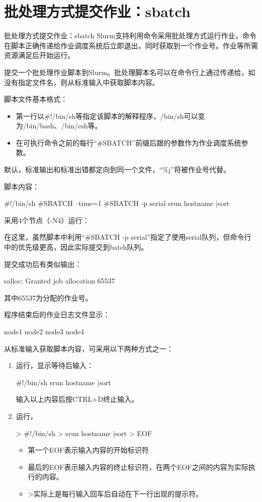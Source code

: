 \section{批处理方式提交作业：sbatch}
\begin{frame}[fragile]{批处理方式提交作业：sbatch}
Slurm支持利用命令采用批处理方式运行作业，命令在脚本正确传递给作业调度系统后立即退出，同时获取到一个作业号。作业等所需资源满足后开始运行。

提交一个批处理作业脚本到Slurm。批处理脚本名可以在命令行上通过传递给，如没有指定文件名，则从标准输入中获取脚本内容。

脚本文件基本格式：
\begin{itemize}
	\item 第一行以\#!/bin/sh等指定该脚本的解释程序，/bin/sh可以变为/bin/bash、/bin/csh等。
	\item 在可执行命令之前的每行``\#SBATCH''前缀后跟的参数作为作业调度系统参数。
\end{itemize}

默认，标准输出和标准出错都定向到同一个文件，``\%j''将被作业号代替。

脚本内容：
\begin{SH}
#!/bin/sh
#SBATCH --time=1
#SBATCH -p serial
srun hostname |sort
\end{SH}

采用4个节点（-N4）运行：

在这里，虽然脚本中利用``\#SBATCH -p serial''指定了使用serial队列，但命令行中的优先级更高，因此实际提交到batch队列。

提交成功后有类似输出：
\begin{OUT}
salloc: Granted job allocation 65537
\end{OUT}
其中65537为分配的作业号。

程序结束后的作业日志文件显示：
\begin{OUT}
node1
node2
node3
node4
\end{OUT}

从标准输入获取脚本内容，可采用以下两种方式之一：
\begin{enumerate}
	\item 运行，显示等待后输入：
\begin{SH}
#!/bin/sh
srun hostname |sort
\end{SH}
输入以上内容后按CTRL+D终止输入。
	\item 运行，
	\begin{SH}
> #!/bin/sh
> srun hostname |sort
> EOF
\end{SH}
\begin{itemize}
	\item 第一个EOF表示输入内容的开始标识符
	\item 最后的EOF表示输入内容的终止标识符，在两个EOF之间的内容为实际执行的内容。
	\item >实际上是每行输入回车后自动在下一行出现的提示符。
\end{itemize}
\end{enumerate}


\end{frame}

